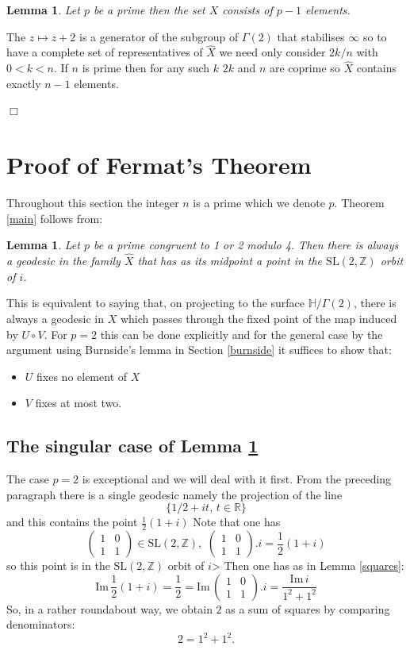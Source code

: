 \documentclass[12pt,a4paper]{amsart}
\newtheorem{lem}[thm]{Lemma}
\def\HH{\mathbb{H}}
\def\im{\mathrm{Im}\,}
\def\xx{\HH/g2}
\def\ZZ{\mathbb{Z}}
\def\RR{\mathbb{R}}
\def\sl2{\mathrm{SL}(2, \ZZ)}
\def\g2{\Gamma(2)}
\def\xx{\HH/\g2}
\begin{document}
\begin{lem} \label{action}
Let $p$ be a prime then the set $X$ consists of $p-1$ elements.
\end{lem}
\proof
The $z \mapsto z + 2$ is a generator of the subgroup of $\g2$ that stabilises $\infty$ so to have a complete set of representatives of $\hat{X}$ we need only consider $2k/n$ with $0 < k < n$. If $n$ is prime then for any such $k$ $2k$ and $n$ are coprime so $\hat{X}$ contains exactly $n-1$ elements.

\hfill $\Box$


 
 \section{Proof of Fermat's Theorem}

Throughout this section the integer $n$ is a prime which we denote $p$.
Theorem \ref{main} follows from:

\begin{lem} \label{midpoint}
Let $p$ be a prime congruent to 1 or 2 modulo 4.
Then there is always a geodesic 
in the family $\hat{X}$
that has as its  midpoint a point in the $\sl2$  orbit of $i$.
\end{lem}

This is equivalent to saying that, on projecting to the surface
$\xx$, there  is always a geodesic in $X$ which passes through the
fixed point of the map induced by $U \circ V$. For $p=2$ this can be
done explicitly and for the general case by the argument using 
Burnside's lemma in Section \ref{burnside} it suffices to show that:

\begin{itemize}
	\item $U$ fixes no element of $X$
	\item $V$ fixes at most two.
\end{itemize}

\subsection{The singular case of Lemma \ref{midpoint}}

The case $p=2$ is exceptional and we will deal with it first.
From the preceding paragraph there is a single geodesic namely 
the projection of the line 
$$\{ 1/2 + i t,\, t \in \RR \}$$
and this contains the point  $\frac{1}{2 }(1+ i)$
Note that one has 
$$\begin{pmatrix}
1 & 0 \\
1 & 1
\end{pmatrix} \in \sl2,\,\, \begin{pmatrix}
1 & 0 \\
1 & 1
\end{pmatrix}.i  = \frac{1}{2 }(1+ i)$$
so this point is in the $\sl2$ orbit of $i$>
Then one has as in Lemma \ref{squares}:
$$\im \frac{1}{2 }(1+ i) = \frac{1}{2}  =  \im \begin{pmatrix}
1 & 0 \\
1 & 1
\end{pmatrix}.i = \frac{\im i}{ 1^2 + 1^2}$$
So, in a rather roundabout way, we obtain $2$ as a sum of squares by comparing denominators:
$$2 = 1^2 + 1^2.$$
\end{document}
